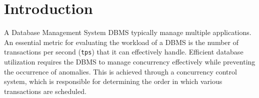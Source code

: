 \section{Introduction}

A Database Management System DBMS typically manage multiple applications.
An essential metric for evaluating the workload of a DBMS is the number of transactions per second (\texttt{tps}) that it can effectively handle. 
Efficient database utilization requires the DBMS to manage concurrency effectively while preventing the occurrence of anomalies. 
This is achieved through a concurrency control system, which is responsible for determining the order in which various transactions are scheduled.